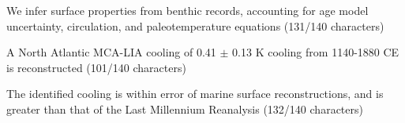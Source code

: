 \documentclass[draft]{agujournal2019}
\begin{document}






\begin{keypoints}
\item We infer surface properties from benthic records, accounting for age model uncertainty, circulation, and paleotemperature equations (131/140 characters)
\item A North Atlantic MCA-LIA cooling of 0.41 $\pm$ 0.13 K cooling from 1140-1880 CE is reconstructed (101/140 characters)
\item The identified cooling is within error of marine surface reconstructions, and is greater than that of the Last Millennium Reanalysis (132/140 characters) 
\end{keypoints}

%
%

%
%
\end{document}
